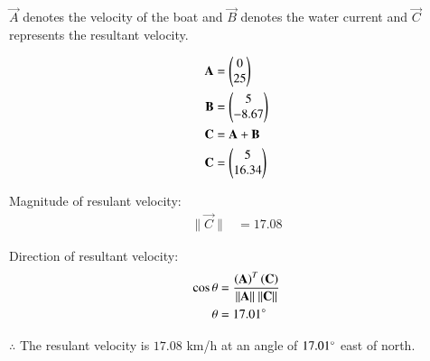 \begin{flushleft}
 $\vec{A}$ denotes the velocity of the boat and $
\vec{B}$ denotes the water current and $\vec{C}$ represents the resultant velocity. 
\end{flushleft}
\begin{align}
\mathbf{A} &=\begin{pmatrix}0\\25\end{pmatrix} \label{eq:constr_a_motion_in_a_plane}\\
\mathbf{B} &=\begin{pmatrix}5\\-8.67\end{pmatrix} \label{eq:constr_b_motion_in_a_plane}\\
\mathbf{C} &= \mathbf{A} + \mathbf{B}\\
\mathbf{C} &= \begin{pmatrix}5\\16.34\end{pmatrix}
\end{align}

Magnitude of resulant velocity:
\begin{align}
\| \vec{C} \| &= 17.08
\end{align}

Direction of resultant velocity:
\begin{align}
\cos{\theta} &= \frac{\brak{\vec{A}}^T\brak{\vec{C}}}{\| \vec{A} \|\ \| \vec{C} \|}\\
\theta &= 17.01\degree
\end{align}

\begin{flushleft}
$\therefore$ The resulant velocity is $17.08$ km/h at an angle of $17.01\degree$ east of north.
\end{flushleft}





